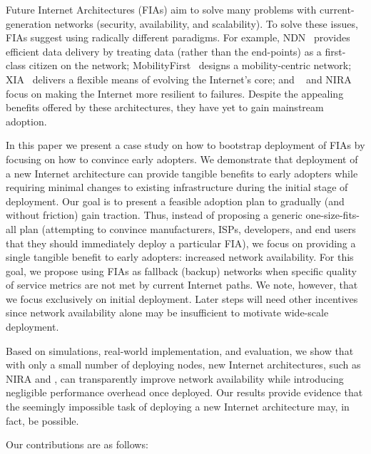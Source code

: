 Future Internet Architectures (FIAs) aim to solve many problems with
current-generation networks (\eg security, availability, and scalability). To
solve these issues, FIAs suggest using radically different paradigms.  For
example, NDN~\cite{Jacobson:2009:NNC:1658939.1658941} provides efficient data
delivery by treating data (rather than the end-points) as a first-class citizen
on the network; MobilityFirst~\cite{Raychaudhuri:2012:MRT:2412096.2412098}
designs a mobility-centric network; XIA~\cite{Han2012} delivers a flexible
means of evolving the Internet's core; and \scion~\cite{scion2011} and
NIRA~\cite{nira2003} focus on making the Internet more resilient to failures.
Despite the appealing benefits offered by these architectures, they have yet to
gain mainstream adoption.

In this paper we present a case study on how to bootstrap deployment of FIAs by
focusing on how to convince early adopters. We demonstrate that deployment of a
new Internet architecture can provide tangible benefits to early adopters while
requiring minimal changes to existing infrastructure during the initial stage
of deployment.  Our goal is to present a feasible adoption plan to gradually
(and without friction) gain traction. Thus, instead of proposing a generic
one-size-fits-all plan (\ie attempting to convince manufacturers, ISPs,
developers, and end users that they should immediately deploy a particular
FIA), we focus on providing a single tangible benefit to early adopters:
increased network availability.  For this goal, we propose using FIAs as
fallback (backup) networks when specific quality of service metrics are not met
by current Internet paths. We note, however, that we focus exclusively on
initial deployment. Later steps will need other incentives since network
availability alone may be insufficient to motivate wide-scale deployment. 

Based on simulations, real-world implementation, and evaluation, we show that
with only a small number of deploying nodes, new Internet architectures, such
as NIRA and \scion, can transparently improve network availability while
introducing negligible performance overhead once deployed.  Our results provide
evidence that the seemingly impossible task of deploying a new Internet
architecture may, in fact, be possible.

Our contributions are as follows:

